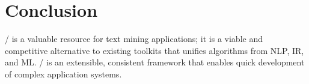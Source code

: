 \section{Conclusion}

\meta/ is a valuable resource for text mining applications; it is a viable and
competitive alternative to existing toolkits that unifies algorithms from NLP,
IR, and ML\@. \meta/ is an extensible, consistent framework that enables quick
development of complex application systems.

